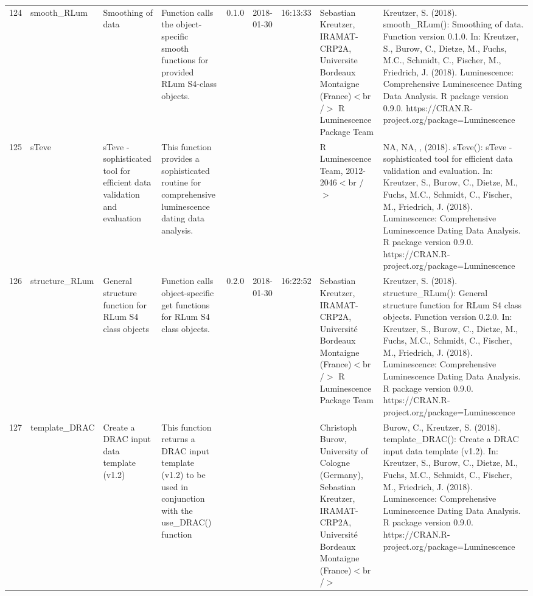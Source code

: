 \begin{table}[ht]
\begin{tabular}{rllllllll}
 \\ 
  124 & smooth\_RLum & Smoothing of data & Function calls the object-specific smooth functions for provided RLum S4-class objects. & 0.1.0 & 2018-01-30 & 16:13:33
 & Sebastian Kreutzer, IRAMAT-CRP2A, Universite Bordeaux Montaigne (France)$<$br /$>$  R Luminescence Package Team & Kreutzer, S. (2018). smooth\_RLum(): Smoothing of data. Function version 0.1.0. In: Kreutzer, S., Burow, C., Dietze, M., Fuchs, M.C., Schmidt, C., Fischer, M., Friedrich, J. (2018). Luminescence: Comprehensive Luminescence Dating Data Analysis. R package version 0.9.0. https://CRAN.R-project.org/package=Luminescence
 \\ 
  125 & sTeve & sTeve - sophisticated tool for efficient data validation and evaluation & This function provides a sophisticated routine for comprehensive luminescence dating data analysis. &  &  &  & R Luminescence Team, 2012-2046$<$br /$>$ & NA, NA, ,  (2018). sTeve(): sTeve - sophisticated tool for efficient data validation and evaluation. In: Kreutzer, S., Burow, C., Dietze, M., Fuchs, M.C., Schmidt, C., Fischer, M., Friedrich, J. (2018). Luminescence: Comprehensive Luminescence Dating Data Analysis. R package version 0.9.0. https://CRAN.R-project.org/package=Luminescence
 \\ 
  126 & structure\_RLum & General structure function for RLum S4 class objects & Function calls object-specific get functions for RLum S4 class objects. & 0.2.0 & 2018-01-30 & 16:22:52
 & Sebastian Kreutzer, IRAMAT-CRP2A, Université Bordeaux Montaigne (France)$<$br /$>$  R Luminescence Package Team & Kreutzer, S. (2018). structure\_RLum(): General structure function for RLum S4 class objects. Function version 0.2.0. In: Kreutzer, S., Burow, C., Dietze, M., Fuchs, M.C., Schmidt, C., Fischer, M., Friedrich, J. (2018). Luminescence: Comprehensive Luminescence Dating Data Analysis. R package version 0.9.0. https://CRAN.R-project.org/package=Luminescence
 \\ 
  127 & template\_DRAC & Create a DRAC input data template (v1.2) & This function returns a DRAC input template (v1.2) to be used in conjunction with the use\_DRAC() function &  &  &  & Christoph Burow, University of Cologne (Germany), Sebastian Kreutzer, IRAMAT-CRP2A, Université Bordeaux Montaigne (France)$<$br /$>$ & Burow, C., Kreutzer, S. (2018). template\_DRAC(): Create a DRAC input data template (v1.2). In: Kreutzer, S., Burow, C., Dietze, M., Fuchs, M.C., Schmidt, C., Fischer, M., Friedrich, J. (2018). Luminescence: Comprehensive Luminescence Dating Data Analysis. R package version 0.9.0. https://CRAN.R-project.org/package=Luminescence

\end{tabular}
\end{table}
